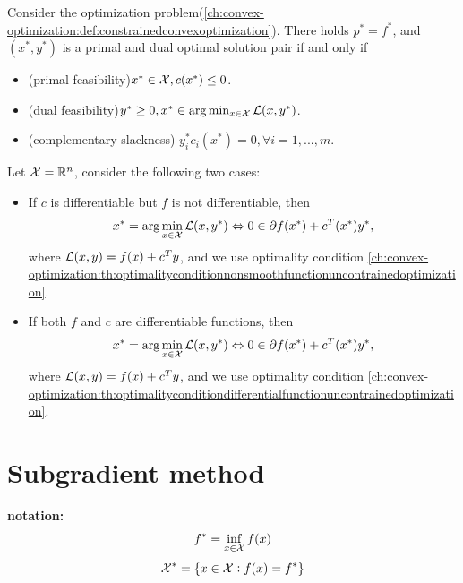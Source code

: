 \begin{refsection}
\begin{definition}
\end{definition}

\begin{theorem}\cite{bertsekas2009convex}\cite[lec 2]{Robinson2015convex}\label{ch:convex-optimization:th:optimalconditiondualitytheory}
Consider the optimization problem(\autoref{ch:convex-optimization:def:constrainedconvexoptimization}). There holds $p^*=f^*$, and $(x^*,y^*)$ is a primal and dual optimal solution pair if and only if
\begin{itemize}
	\item (primal feasibility)$x^*\in \mathcal{X}, c(x^*)\leq 0$.
	\item (dual feasibility)$y^*\geq 0, x^* \in \arg\min_{x\in \mathcal{X}} \mathcal{L}(x,y^*)$.
	\item (complementary slackness) $y^*_i c_i(x^*) = 0,\forall i=1,...,m.$
\end{itemize}
\end{theorem}


\begin{remark}
Let $\mathcal{X} = \mathbb{R}^n$, consider the following two cases:
\begin{itemize}
	\item If $c$ is differentiable but $f$ is not differentiable, then 
	$$x^* = \arg\min_{x\in \mathcal{X}} \mathcal{L}(x,y^*) \Leftrightarrow 0 \in \partial f(x^*) + c^T(x^*)y^*,$$
	where $\mathcal{L}(x,y) = f(x) + c^Ty$, and we use optimality condition \autoref{ch:convex-optimization:th:optimalityconditionnonsmoothfunctionuncontrainedoptimization}. 
	\item If both $f$ and $c$ are differentiable functions, then 
	$$x^* = \arg\min_{x\in \mathcal{X}} \mathcal{L}(x,y^*) \Leftrightarrow 0 \in \partial f(x^*) + c^T(x^*)y^*,$$
	where $\mathcal{L}(x,y) = f(x) + c^Ty$, and we use optimality condition \autoref{ch:convex-optimization:th:optimalityconditiondifferentialfunctionuncontrainedoptimization}. 
	
\end{itemize}
	
\end{remark}




\section{Subgradient method}
\begin{mdframed}
	\textbf{notation:}\\
	$$f^* = \inf_{x\in \mathcal{X}} f(x)$$
	$$\mathcal{X}^* = \{x\in \mathcal{X}: f(x) = f^*\}$$
\end{mdframed}


\end{refsection}
